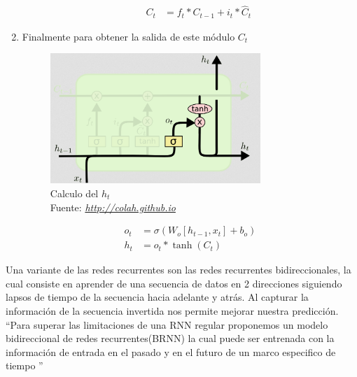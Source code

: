 \begin{enumerate}
\begin{enumerate}
\begin{equation}
\begin{aligned}
				C_{t}&=f_{t}\ast C_{t-1} + i_{t}\ast \hat{C}_{t}
		    \end{aligned}
		\end{equation}
	\end{enumerate}
\item Finalmente para obtener la salida de este módulo $C_{t}$
		\begin{figure}[H]
	\centering
	\includegraphics[width=0.75\textwidth]{Figures/LSTM9.png}
	\caption{Calculo del $h_{t}$ \\ Fuente:  \href{http://colah.github.io/posts/2015-08-Understanding-LSTMs/}{\textit{http://colah.github.io}}}
	\label{}
\end{figure}
		\begin{equation}
			\label{ht}
			\begin{aligned}
				o_{t}&=\sigma(W_{o}[h_{t-1},x_{t}]+b_{o})\\
				h_{t}&=o_{t}\ast \tanh(C_{t})
			\end{aligned}
		\end{equation}
\end{enumerate}

Una variante de las redes recurrentes son las redes recurrentes bidireccionales, la cual consiste en aprender de una secuencia de datos en 2 direcciones siguiendo lapsos de tiempo de la secuencia hacia adelante y atrás. Al capturar la información de la secuencia invertida nos permite mejorar nuestra predicción.	\textquotedblleft Para superar las limitaciones de una RNN regular proponemos un modelo bidireccional de redes recurrentes(BRNN) la cual puede ser entrenada con la información de entrada en el pasado y en el futuro de un marco especifico de tiempo \textquotedblright \cite{BRNN}





